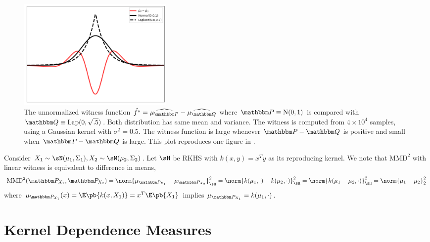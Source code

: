 \documentclass[11pt]{article}
\begin{document}
\begin{figure}[h!]
\begin{center} 
    \includegraphics[width=3in]{assets/mmd_gauss_laplace_witness} 
    \caption{The unnormalized witness function $\hat{f^*} = \widehat{\mu_{\bbP}} - \widehat{\mu_{\bbQ}}$ where $\bbP \equiv \text{N}(0,1)$ is compared with $\bbQ \equiv \text{Lap}(0,\sqrt{.5})$. Both distribution has same mean and variance. The witness is computed from $4\times 10^4$ samples, using a Gaussian kernel with $\sigma^2=0.5$. The witness function is large whenever $\bbP-\bbQ$ is positive and small when $\bbP-\bbQ$ is large. This plot reproduces one figure in \cite{grettonKernelTwoSampleTest2012}.}
    \label{fig:mmd_gauss_laplace_witness}
\end{center}
\end{figure}

    

\begin{example}
    Consider $X_1\sim \sN(\mu_1,\Sigma_1), X_2\sim \sN(\mu_2,\Sigma_2)$. Let $\sH$ be RKHS with $k(x,y)=x^Ty$ as its reproducing kernel. We note that $\text{MMD}^2$ with linear witness is equivalent to difference in means,
    \begin{align}
        \text{MMD}^2(\bbP_{X_1},\bbP_{X_2})
            = \norm{\mu_{\bbP_{X_1}} - \mu_{\bbP_{X_2}}}_{\sH}^2
            = \norm{ k(\mu_1, \cdot) - k(\mu_2,\cdot) }_{\sH}^2
            = \norm{ k(\mu_1-\mu_2,\cdot) }_{\sH}^2
            = \norm{\mu_1 - \mu_2}_2^2
    \end{align}
    where $\mu_{\bbP_{X_1}}(x) = \E\pb{ k(x, X_1) } = x^T\E\pb{X_1}$ implies $\mu_{\bbP_{X_1}} = k(\mu_1, \cdot)$.
\end{example}





\section{Kernel Dependence Measures}
\end{document}
